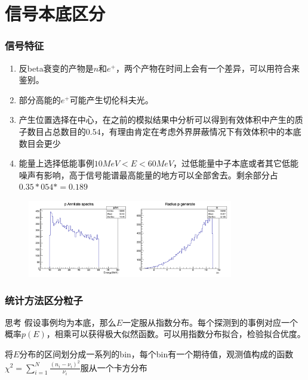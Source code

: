 \documentclass{beamer}
\begin{document}
\section{信号本底区分}
\begin{frame}
    \frametitle{信号特征}
    \begin{enumerate}
        \item 反beta衰变的产物是$n$和$e^+$，两个产物在时间上会有一个差异，可以用符合来鉴别。
        \item 部分高能的$e^+$可能产生切伦科夫光。
        \item 产生位置选择在中心，在之前的模拟结果中分析可以得到有效体积中产生的质子数目占总数目的$0.54$，有理由肯定在考虑外界屏蔽情况下有效体积中的本底数目会更少
        \item 能量上选择低能事例$10MeV<E<60MeV$，过低能量中子本底或者其它低能噪声有影响，高于信号能谱最高能量的地方可以全部舍去。剩余部分占$0.35*054*=0.189$
    \end{enumerate}
    \begin{figure}[h]
        \includegraphics[width=0.8\textwidth]{../../B2/final/backgroundlinear_2.png}
    \end{figure}
\end{frame}
\begin{frame}
    \frametitle{统计方法区分粒子}
    \begin{block}{思考}
        假设事例均为本底，那么$E$一定服从指数分布。每个探测到的事例对应一个概率$p(E)$，相乘可以获得极大似然函数。可以用指数分布拟合，检验拟合优度。

        将$E$分布的区间划分成一系列的bin，每个bin有一个期待值，观测值构成的函数$\chi^2=\sum_{i=1}^{N}{\frac{(n_i-\nu_i)^2}{\nu_i}}$服从一个卡方分布
    \end{block}
\end{frame}
\end{document}
